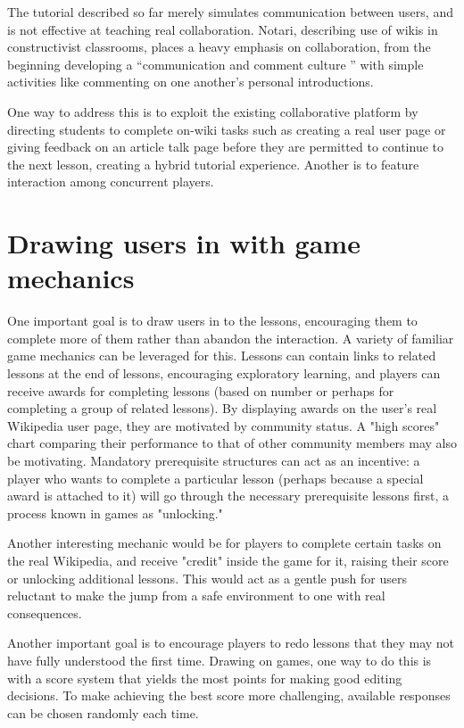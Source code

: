\documentclass{acm_proc_article-sp}
\begin{document}
The tutorial described so far merely simulates communication between users, and is not effective at teaching real collaboration. Notari,\cite{Notari:2006} describing use of wikis in constructivist classrooms, places a heavy emphasis on collaboration, from the beginning developing a ``communication and comment culture '' with simple activities like commenting on one another's personal introductions.

One way to address this is to exploit the existing collaborative platform by directing students to complete on-wiki tasks such as creating a real user page or giving feedback on an article talk page before they are permitted to continue to the next lesson, creating a hybrid tutorial experience. Another is to feature interaction among concurrent players.

\section{Drawing users in with game mechanics}

One important goal is to draw users in to the lessons, encouraging them to complete more of them rather than abandon the interaction. A variety of familiar game mechanics can be leveraged for this. Lessons can contain links to related lessons at the end of lessons, encouraging exploratory learning, and players can receive awards for completing lessons (based on number or perhaps for completing a group of related lessons). By displaying awards on the user's real Wikipedia user page, they are motivated by community status. A "high scores" chart comparing their performance to that of other community members may also be motivating. Mandatory prerequisite structures can act as an incentive: a player who wants to complete a particular lesson (perhaps because a special award is attached to it) will go through the necessary prerequisite lessons first, a process known in games as "unlocking."

Another interesting mechanic would be for players to complete certain tasks on the real Wikipedia, and receive "credit" inside the game for it, raising their score or unlocking additional lessons. This would act as a gentle push for users reluctant to make the jump from a safe environment to one with real consequences.

Another important goal is to encourage players to redo lessons that they may not have fully understood the first time. Drawing on games, one way to do this is with a score system that yields the most points for making good editing decisions. To make achieving the best score more challenging, available responses can be chosen randomly each time.
\end{document}
